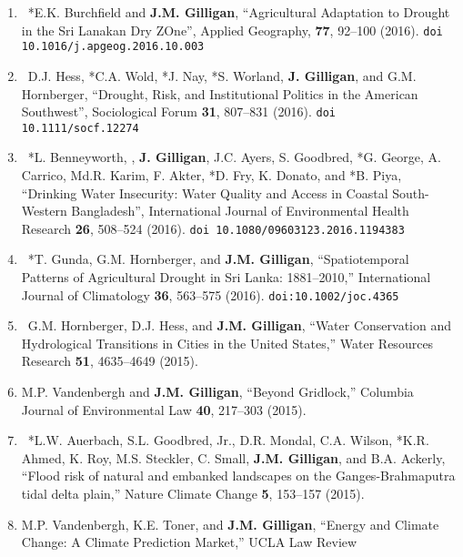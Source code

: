 %
%
\begin{enumerate}
    \item 
    \textdagger\
    *E.K. Burchfield and \textbf{J.M. Gilligan}, 
    \enquote{Agricultural Adaptation to Drought in the Sri Lanakan Dry ZOne},
    Applied Geography, \textbf{77}, 92--100 (2016). 
    \nolinkurl{doi 10.1016/j.apgeog.2016.10.003}
%
    \item
    \textdagger\
    D.J. Hess, *C.A. Wold, *J. Nay, *S. Worland, \textbf{J. Gilligan}, and G.M. Hornberger, 
    \enquote{Drought, Risk, and Institutional Politics in the American Southwest},
    Sociological Forum \textbf{31}, 807--831 (2016).
    \nolinkurl{doi 10.1111/socf.12274}
%
    \item
    \textdagger\
    *L. Benneyworth, , \textbf{J. Gilligan}, J.C. Ayers, S. Goodbred, *G. George, A. Carrico, Md.R. Karim, F. Akter, *D. Fry, K. Donato, and *B. Piya,
    \enquote{Drinking Water Insecurity: Water Quality and Access in Coastal South-Western Bangladesh},
    International Journal of Environmental Health Research \textbf{26}, 508--524 (2016).
    \nolinkurl{doi 10.1080/09603123.2016.1194383}
%
    \item 
    \textdagger\ 
    *T. Gunda, G.M. Hornberger, and \textbf{J.M. Gilligan}, 
    \enquote{Spatiotemporal Patterns of Agricultural Drought in Sri Lanka: 1881--2010,}
    International Journal of Climatology \textbf{36}, 563--575 (2016).
    \nolinkurl{doi:10.1002/joc.4365}
%
    \item 
    \textdagger\
    G.M. Hornberger, D.J. Hess, and \textbf{J.M. Gilligan}, 
    \enquote{Water Conservation and Hydrological Transitions in Cities in the United States,}
     Water Resources Research \textbf{51}, 4635--4649 (2015).
%
    \item 
    M.P. Vandenbergh and \textbf{J.M. Gilligan}, 
    \enquote{Beyond Gridlock,}
    Columbia Journal of Environmental Law
    \textbf{40}, 217--303 (2015).
%
    \item 
    \textdagger\ 
    *L.W. Auerbach, S.L. Goodbred, Jr., D.R. Mondal, C.A. Wilson, *K.R. Ahmed, K. Roy, M.S. Steckler, C. Small, \textbf{J.M. Gilligan}, and B.A. Ackerly,
    \enquote{Flood risk of natural and embanked landscapes on the Ganges-Brahmaputra tidal delta plain,}
    Nature Climate Change
    \textbf{5}, 153--157 (2015).
%
    \item 
    M.P. Vandenbergh, K.E. Toner, and \textbf{J.M. Gilligan}, 
    \enquote{Energy and Climate Change: A Climate Prediction Market,}
    UCLA Law Review 

\end{enumerate}
